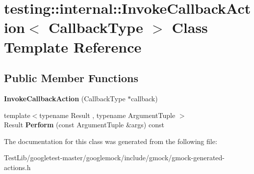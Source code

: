 \hypertarget{classtesting_1_1internal_1_1InvokeCallbackAction}{}\section{testing\+:\+:internal\+:\+:Invoke\+Callback\+Action$<$ Callback\+Type $>$ Class Template Reference}
\label{classtesting_1_1internal_1_1InvokeCallbackAction}
\subsection*{Public Member Functions}
\begin{DoxyCompactItemize}
\item 
\mbox{\label{classtesting_1_1internal_1_1InvokeCallbackAction_a21b051db0b2e1d33fd8d5cdfe7e6824b}} 
{\bfseries Invoke\+Callback\+Action} (Callback\+Type $\ast$callback)
\item 
\mbox{\label{classtesting_1_1internal_1_1InvokeCallbackAction_a74278acbfc51fe7407fdabc9d6a42c70}} 
{\footnotesize template$<$typename Result , typename Argument\+Tuple $>$ }\\Result {\bfseries Perform} (const Argument\+Tuple \&args) const
\end{DoxyCompactItemize}


The documentation for this class was generated from the following file\+:\begin{DoxyCompactItemize}
\item 
Test\+Lib/googletest-\/master/googlemock/include/gmock/gmock-\/generated-\/actions.\+h\end{DoxyCompactItemize}
